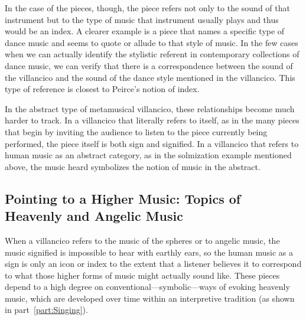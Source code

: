 In the case of the  pieces, though, the piece refers not only to the sound of that instrument but to the type of music that instrument usually plays and thus would be an index.
A clearer example is a piece that names a specific type of dance music and seems to quote or allude to that style of music.
In the few cases when we can actually identify the stylistic referent in contemporary collections of dance music, we can verify that there is a  correspondence between the sound of the villancico and the sound of the dance style mentioned in the villancico.
This type of reference is closest to Peirce's notion of index.

In the abstract type of metamusical villancico, these relationships become much harder to track.
In a villancico that literally refers to itself, as in the many pieces that begin by inviting the audience to listen to the piece currently being performed, the piece itself is both sign and signified.
In a villancico that refers to human music as an abstract category, as in the solmization example mentioned above, the music heard symbolizes the notion of music in the abstract.

\subsection{%
Pointing to a Higher Music: Topics of Heavenly and Angelic Music
}

When a villancico refers to the music of the spheres or to angelic music, the music signified is impossible to hear with earthly ears, so the human music as a sign is only an icon or index to the extent that a listener believes it to correspond to what those higher forms of music might actually sound like.
These pieces depend to a high degree on conventional---symbolic---ways of evoking heavenly music, which are developed over time within an interpretive tradition (as shown in part~\ref{part:Singing}).


